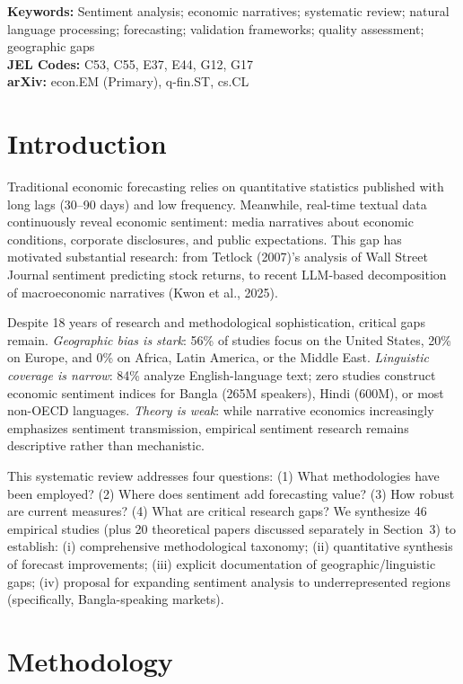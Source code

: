 \documentclass[11pt,twocolumn]{article}
\begin{document}
\noindent \textbf{Keywords:} Sentiment analysis; economic narratives; systematic review; natural language processing; forecasting; validation frameworks; quality assessment; geographic gaps \\
\textbf{JEL Codes:} C53, C55, E37, E44, G12, G17 \\
\textbf{arXiv:} econ.EM (Primary), q-fin.ST, cs.CL

\section{Introduction}

Traditional economic forecasting relies on quantitative statistics published with long lags (30--90 days) and low frequency. Meanwhile, real-time textual data continuously reveal economic sentiment: media narratives about economic conditions, corporate disclosures, and public expectations. This gap has motivated substantial research: from Tetlock (2007)'s analysis of Wall Street Journal sentiment predicting stock returns, to recent LLM-based decomposition of macroeconomic narratives (Kwon et al., 2025).

Despite 18 years of research and methodological sophistication, critical gaps remain. \textit{Geographic bias is stark}: 56\% of studies focus on the United States, 20\% on Europe, and 0\% on Africa, Latin America, or the Middle East. \textit{Linguistic coverage is narrow}: 84\% analyze English-language text; zero studies construct economic sentiment indices for Bangla (265M speakers), Hindi (600M), or most non-OECD languages. \textit{Theory is weak}: while narrative economics increasingly emphasizes sentiment transmission, empirical sentiment research remains descriptive rather than mechanistic.

This systematic review addresses four questions: (1) What methodologies have been employed? (2) Where does sentiment add forecasting value? (3) How robust are current measures? (4) What are critical research gaps? We synthesize 46 empirical studies (plus 20 theoretical papers discussed separately in Section~3) to establish: (i) comprehensive methodological taxonomy; (ii) quantitative synthesis of forecast improvements; (iii) explicit documentation of geographic/linguistic gaps; (iv) proposal for expanding sentiment analysis to underrepresented regions (specifically, Bangla-speaking markets).

\section{Methodology}
\end{document}
